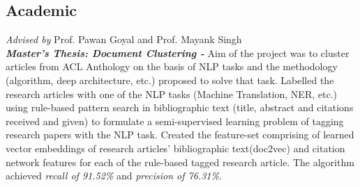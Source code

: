 \documentclass[11pt,a4paper,sans]{moderncv}        %
\begin{document}
\subsection{Academic}
{\textit{Advised by } Prof. Pawan Goyal and Prof. Mayank Singh\\
\textbf{\textit{Master's Thesis: Document Clustering -}} Aim of the project was to cluster articles from ACL Anthology on the basis of NLP tasks and the methodology (algorithm, deep architecture, etc.) proposed to solve that task. 
Labelled the research articles with one of the NLP tasks (Machine Translation, NER, etc.) using rule-based pattern search in bibliographic text (title, abstract and citations received and given) to formulate a semi-supervised learning problem of tagging research papers with the NLP task. Created the feature-set comprising of learned vector embeddings of research articles’ bibliographic text(doc2vec) and citation network features for each of the rule-based tagged research article. The algorithm achieved \textit{recall of 91.52\%} and \textit{precision of 76.31\%}. \\}
\vspace{-2mm}
\vspace{-3mm}
\end{document}
